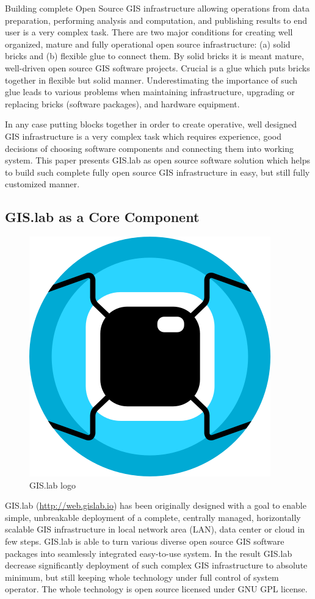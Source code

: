 \documentclass{isprs}
\begin{document}
Building complete Open Source GIS infrastructure allowing operations
from data preparation, performing analysis and computation, and
publishing results to end user is a very complex task. There are two
major conditions for creating well organized, mature and fully
operational open source infrastructure: (a) solid bricks and (b)
flexible glue to connect them. By solid bricks it is meant mature,
well-driven open source GIS software projects. Crucial is a glue which
puts bricks together in flexible but solid manner. Underestimating the
importance of such glue leads to various problems when maintaining
infrastructure, upgrading or replacing bricks (software packages), and
hardware equipment.

In any case putting blocks together in order to create operative, well
designed GIS infrastructure is a very complex task which requires
experience, good decisions of choosing software components and
connecting them into working system. This paper presents GIS.lab as
open source software solution which helps to build such complete fully
open source GIS infrastructure in easy, but still fully customized
manner.

\subsection{GIS.lab as a Core Component}

\begin{figure}[ht!]
\begin{center}
  \includegraphics[width=.25\columnwidth]{figures/gislab-logo.png}
  \caption{GIS.lab logo}
\label{fig:gislab_logo}
\end{center}
\end{figure}

GIS.lab (\url{http://web.gislab.io}) has been originally designed with
a goal to enable simple, unbreakable deployment of a complete,
centrally managed, horizontally scalable GIS infrastructure in local
network area (LAN), data center or cloud in few steps. GIS.lab is
able to turn various diverse open source GIS software packages into
seamlessly integrated easy-to-use system. In the result GIS.lab
decrease significantly deployment of such complex GIS infrastructure to
absolute minimum, but still keeping whole technology under full
control of system operator. The whole technology is open source
licensed under GNU GPL license.
\end{document}
